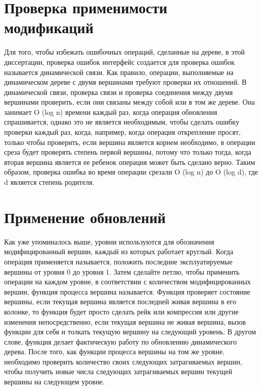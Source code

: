 \documentclass[specification,annotation]{itmo-student-thesis}
\newcommand{\revise}[1]{{\color{red!70!black} #1 }}
\begin{document}
\section{Проверка применимости модификаций}

\revise{
Для того, чтобы избежать ошибочных операций, сделанные на дереве, в этой диссертации, проверка ошибок интерфейс создается для проверка ошибок называется динамической связи. Как правило, операции, 
выполняемые на динамическом дереве с двумя вершинами требуют проверки их отношений. В динамической связи, проверка связи и проверка соединения между двумя вершинами проверить, если они связаны между собой 
или в том же дереве. Она занимает O (log n) времени каждый раз, когда операция обновления спрашивается, однако это не является необходимым, чтобы сделать ошибку проверки каждый раз, когда, например, когда 
операция открепление просят, только чтобы проверить, если вершина является корнем необходимо, в операции среза будет проверять степень первой вершины, потому что только тогда, когда вторая вершина 
является ее ребенок операция может быть сделано верно. Таким образом, проверка ошибка во время операции срезали O (log n) до O (log d), где d является степень родителя.
}

\section{Применение обновлений}

\revise{
Как уже упоминалось выше, уровни используются для обозначения модифицированный вершин, каждый из которых работает круглый. Когда операция применяется называется, положить последние эксплуатируемые вершины 
от уровня 0 до уровня 1. Затем сделайте петлю, чтобы применить операции на каждом уровне, в соответствии с количеством модифицированных вершин, функция процесса вершина называется. Функция проверяет 
состояние вершины, если текущая вершина является последней живая вершина в его колонке, то функция будет просто сделать рейк или компрессия или другие изменения непосредственно, если текущая вершина не 
живая вершина, вызов функции для себя и толкать текущую вершину на следующий уровень. В другом слове, функция делает фактическую работу по обновлению динамического дерева. После того, как функции процесса 
вершины на том же уровне, необходимо проверить количество своих следующих затрагиваемых вершин, чтобы получить новые числа следующих затрагиваемых вершин текущей вершины на следующем уровне.
}
\end{document}
